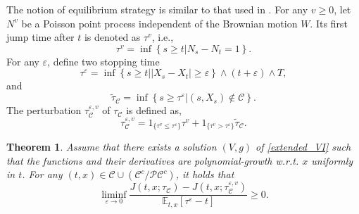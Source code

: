 \documentclass[11pt]{article}
\newtheorem{theorem}{Theorem}[section]
\begin{document}
The notion of equilibrium strategy is similar to that used in \cite{christensen2020time}. 
For any $v \ge 0$, let $N^{v}$ be a Poisson point process independent of the Brownian motion $W$. Its first jump time after $t$ is denoted as $\tau^v$, i.e.,
$$
\tau^v=\inf\left\{s \ge t| N_s-N_t=1\right\}.
$$
For any $\varepsilon$, define two stopping time 
$$
\tau^{\varepsilon}=\inf\left\{s\ge t| |X_s-X_t|\ge \varepsilon\right\} \wedge (t+\varepsilon) \wedge T,
$$
and 
$$
\tilde \tau_{\mathcal C}=\inf\left\{s \ge \tau^\varepsilon| (s,X_s) \notin \mathcal C\right\}.
$$
The   perturbation $\tau^{\varepsilon,v}_\mathcal C$ of $\tau_\mathcal C$  is defined as,
$$
\tau_{\mathcal C}^{\varepsilon,v}=1_{\{\tau^v \le \tau^\varepsilon \}} \tau^v +1_{\{\tau^v > \tau^\varepsilon \}}\tilde \tau_{\mathcal C}.
$$
\begin{theorem}\label{thm_stopping}
Assume that there exists a  solution $(V,g)$ of \eqref{extended_VI} such that the functions and their derivatives are polynomial-growth w.r.t. $x$ uniformly in $t$. For any  $(t,x) \in \mathcal C \cup (\mathcal C^c/\mathcal P \mathcal C^c)$, it holds that 
$$ \liminf_{\varepsilon\to0}\frac{J(t,x;\tau_{\mathcal C})-J(t,x;\tau_{\mathcal C}^{\varepsilon,v})}{\mathbb E_{t,x}[\tau^{\varepsilon}-t]}\ge 0.
$$
\end{theorem}
\end{document}
